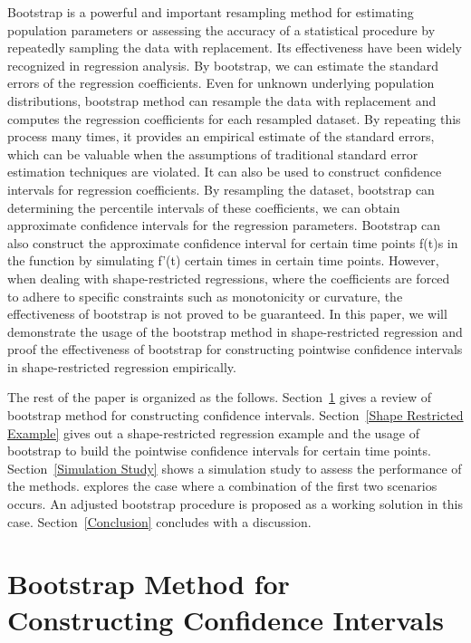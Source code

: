 \documentclass[12pt]{article}
\begin{document}
Bootstrap is a powerful and important resampling method for estimating population parameters or assessing the accuracy of a statistical procedure by repeatedly sampling the data with replacement. Its effectiveness have been widely recognized in regression analysis. By bootstrap, we can estimate the standard errors of the regression coefficients. Even for unknown underlying population distributions, bootstrap method can resample the data with replacement and computes the regression coefficients for each resampled dataset. By repeating this process many times, it provides an empirical estimate of the standard errors, which can be valuable when the assumptions of traditional standard error estimation techniques are violated. It can also be used to construct confidence intervals for regression coefficients. By resampling the dataset, bootstrap can determining the percentile intervals of these coefficients, we can obtain approximate confidence intervals for the regression parameters. Bootstrap can also construct the approximate confidence interval for certain time points f(t)s in the function by simulating f'(t) certain times in certain time points. However, when dealing with shape-restricted regressions, where the coefficients are forced to adhere to specific constraints such as monotonicity or curvature, the effectiveness of bootstrap is not proved to be guaranteed. In this paper, we will demonstrate the usage of the bootstrap method in shape-restricted regression and proof the effectiveness of bootstrap for constructing pointwise confidence intervals in shape-restricted regression empirically.

The rest of the paper is organized as the follows. Section~\ref{Bootstrap Method for Constructing Confidence Intervals} gives a review of bootstrap method for constructing confidence intervals. Section~\ref{Shape Restricted Example} gives out a shape-restricted regression example and the usage of bootstrap to build the pointwise confidence intervals for certain time points. Section~\ref{Simulation Study} shows a simulation study to assess the performance of the methods.
explores the case where a combination of the first two scenarios occurs. An  
adjusted bootstrap procedure is proposed as a working solution in this case.  
Section~\ref{Conclusion} concludes with a discussion.




\section{Bootstrap Method for Constructing Confidence Intervals}
\label{Bootstrap Method for Constructing Confidence Intervals}
\end{document}
